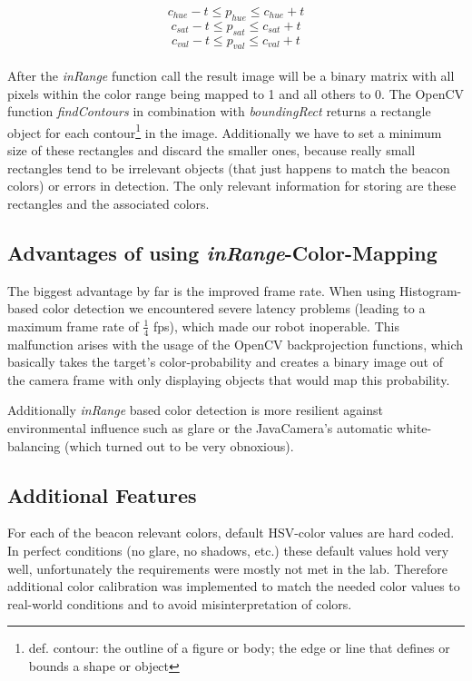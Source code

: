 \documentclass[703031]{iisreport}
\begin{document}
\[c_{hue} - t \le p_{hue} \le c_{hue} + t\]
\[c_{sat} - t \le p_{sat} \le c_{sat} + t\]
\[c_{val} - t \le p_{val} \le c_{val} + t\]\\
After the \emph{inRange} function call\cite{opencv_man_arrays} the result image will be a binary matrix with all pixels within the color range being mapped to 1 and all others to 0. The OpenCV function \emph{findContours}\cite{opencv_man_struct_analysis} in combination with \emph{boundingRect}\cite{opencv_man_struct_analysis} returns a rectangle object for each contour\footnote{def. contour: the outline of a figure or body; the edge or line that defines or bounds a shape or object\cite{dict_contour}} in the image. Additionally we have to set a minimum size of these rectangles and discard the smaller ones, because really small rectangles tend to be irrelevant objects (that just happens to match the beacon colors) or errors in detection.
The only relevant information for storing are these rectangles and the associated colors. 

\subsection{Advantages of using \emph{inRange}-Color-Mapping}
The biggest advantage by far is the improved frame rate. When using Histogram-based color detection we encountered severe latency problems (leading to a maximum frame rate of $\frac{1}{4}$ fps), which made our robot inoperable. This malfunction arises with the usage of the OpenCV backprojection functions, which basically takes the target's color-probability and creates a binary image out of the camera frame with only displaying objects that would map this probability.

Additionally \emph{inRange} based color detection is more resilient against environmental influence such as glare or the JavaCamera's automatic white-balancing (which turned out to be very obnoxious).

\subsection{Additional Features}
For each of the beacon relevant colors, default HSV-color values are hard coded. In perfect conditions (no glare, no shadows, etc.) these default values hold very well, unfortunately the requirements were mostly not met in the lab. Therefore additional color calibration was implemented to match the needed color values to real-world conditions and to avoid misinterpretation of colors.
\end{document}
